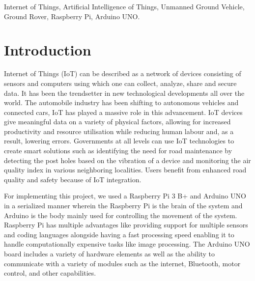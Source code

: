 \documentclass[conference,a4paper]{IEEEtran}
\begin{document}
\begin{IEEEkeywords}
Internet of Things, Artificial Intelligence of Things, Unmanned Ground Vehicle, Ground Rover, Raspberry Pi, Arduino UNO.
\end{IEEEkeywords}

\section{Introduction}






Internet of Things (IoT) can be described as a network of devices consisting of sensors and computers using which one can collect, analyze, share and secure data.
It has been the trendsetter in new technological developments all over the world. The automobile industry has been shifting to autonomous vehicles and connected cars, IoT has played a massive role in this advancement\cite{8}. IoT devices give meaningful data on a variety of physical factors, allowing for increased productivity and resource utilisation while reducing human labour and, as a result, lowering errors. Governments at all levels can use IoT technologies to create smart solutions such as identifying the need for road maintenance by detecting the post holes based on the vibration of a device and monitoring the air quality index in various neighboring localities. Users benefit from enhanced road quality and safety because of IoT integration.

For implementing this project, we used a Raspberry Pi 3 B+ and Arduino UNO in a serialized manner wherein the Raspberry Pi is the brain of the system and Arduino is the body mainly used for controlling the movement of the system. Raspberry Pi has multiple advantages like providing support for multiple sensors and coding languages alongside having a fast processing speed enabling it to handle computationally expensive tasks like image processing. The Arduino UNO board includes a variety of hardware elements as well as the ability to communicate with a variety of modules such as the internet, Bluetooth, motor control, and other capabilities.
\end{document}
